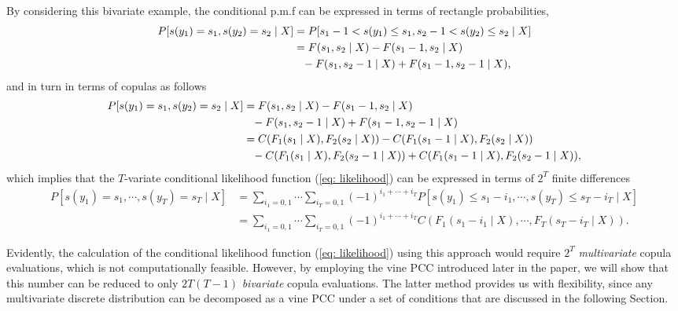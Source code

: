 \documentclass[harvard,11pt]{article}
\begin{document}
By considering this bivariate example, the conditional p.m.f can be expressed in terms of rectangle probabilities, 
\begingroup
\allowdisplaybreaks
\begin{align*}
P[s(y_1)=s_1,s(y_2)=s_2\mid X]&=P[s_1-1<s(y_1)\leq s_1,s_2-1<s(y_2)\leq s_2\mid X]\\
&=F(s_1,s_2\mid X)-F(s_1-1,s_2\mid X)\\
&\textcolor{white}{=}-F(s_1,s_2-1\mid X)+F(s_1-1,s_2-1\mid X),
\end{align*}
\endgroup
and in turn in terms of copulas as follows
\begingroup
\allowdisplaybreaks
\begin{align*}
P[s(y_1)=s_1,s(y_2)=s_2\mid X]&=F(s_1,s_2\mid X)-F(s_1-1,s_2\mid X)\\
&\textcolor{white}{=}-F(s_1,s_2-1\mid X)+F(s_1-1,s_2-1\mid X)\\
&=C(F_1(s_1\mid X),F_2(s_2\mid X))-C(F_1(s_1-1\mid X),F_2(s_2\mid X))\\
&\textcolor{white}{=}-C(F_1(s_1\mid X),F_2(s_2-1\mid X))+C(F_1(s_1-1\mid X),F_2(s_2-1\mid X)),
\end{align*}
\endgroup
which implies that the $T$-variate conditional likelihood function (\ref{eq: likelihood}) can be expressed in terms of $2^T$ finite differences
\begingroup
\allowdisplaybreaks
\begin{align*}
P[s(y_1)=s_1,\cdots,s(y_T)=s_T\mid X]&=\sum\limits_{i_1=0,1}\cdots\sum\limits_{i_T=0,1}(-1)^{i_1+\cdots+i_T}P[s(y_1)\leq s_1-i_1,\cdots,s(y_T)\leq s_T-i_T\mid X]\\
&=\sum\limits_{i_1=0,1}\cdots\sum\limits_{i_T=0,1}(-1)^{i_1+\cdots+i_T}C(F_1(s_1-i_1\mid X),\cdots,F_T(s_T-i_T\mid X)).
\end{align*}
\endgroup 

Evidently, the calculation of the conditional likelihood function (\ref{eq: likelihood}) using this approach would require $2^T$ \textit{multi\-variate} copula evaluations, which is not computationally feasible. However, by employing the vine PCC introduced later in the paper, we will show that this number can be reduced to only $2T(T-1)$ \textit{bivariate} copula evaluations. The latter method provides us with flexibility, since any multivariate discrete distribution can be decomposed as a vine PCC under a set of conditions that are discussed in the following Section. 
\end{document}
